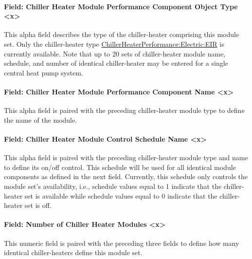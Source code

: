 \paragraph{Field: Chiller Heater Module Performance Component Object Type \textless{}x\textgreater{}}\label{field-chiller-heater-module-performance-component-object-type-x}

This alpha field describes the type of the chiller-heater comprising this module set. Only the chiller-heater type \hyperref[chillerheaterperformancelectriceir]{ChillerHeaterPerformance:Electric:EIR} is currently available. Note that up to 20 sets of chiller-heater module name, schedule, and number of identical chiller-heater may be entered for a single central heat pump system.

\paragraph{Field: Chiller Heater Module Performance Component Name \textless{}x\textgreater{}}\label{field-chiller-heater-module-performance-component-name-x}

This alpha field is paired with the preceding chiller-heater module type to define the name of the module.

\paragraph{Field: Chiller Heater Module Control Schedule Name \textless{}x\textgreater{}}\label{field-chiller-heater-module-control-schedule-name-x}

This alpha field is paired with the preceding chiller-heater module type and name to define its on/off control. This schedule will be used for all identical module components as defined in the next field. Currently, this schedule only controls the module set's availability, i.e., schedule values equal to 1 indicate that the chiller-heater set is available while schedule values equal to 0 indicate that the chiller-heater set is off.

\paragraph{Field: Number of Chiller Heater Modules \textless{}x\textgreater{}}\label{field-number-of-chiller-heater-modules-x}

This numeric field is paired with the preceding three fields to define how many identical chiller-heaters define this module set.

